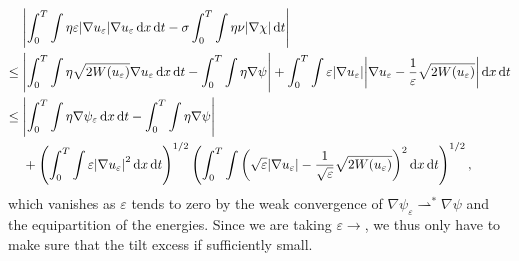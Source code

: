 \begin{align*}
	& 
	\abs{ 
	\int_{ 0 }^{ T }
		\int
			\eta
			\varepsilon
			\abs{ \nabla u_{ \varepsilon } }
			\nabla u_{ \varepsilon }
		\dd{ x }
	\dd{ t }
	-
	\sigma
	\int_{ 0 }^{ T }
		\int
			\eta
			\nu 
		\abs{ \nabla \chi }
	\dd{ t }
	}
	\\
	\leq {} &
	\abs{
		\int_{ 0 }^{ T }
			\int	
				\eta
				\sqrt{ 2 W ( u_{ \varepsilon } ) }
				\nabla u_{ \varepsilon }
			\dd{ x }
		\dd{ t }
		-
		\int_{ 0 }^{ T }
			\int
				\eta
				\nabla \psi
	}
	+
	\int_{ 0 }^{ T }
		\int
			\varepsilon
			\abs{ \nabla u_{ \varepsilon } }
			\abs{ \nabla u_{ \varepsilon } - \frac{ 1 }{ \varepsilon } \sqrt{ 2 W ( u_{ \varepsilon } ) } }
		\dd{ x }
	\dd{ t }
	\\
	\leq {} &
	\abs{
		\int_{ 0 }^{ T }
			\int
				\eta
				\nabla \psi_{ \varepsilon } 
			\dd{ x }
		\dd{ t }
		-
		\int_{ 0 }^{ T }
			\int
				\eta
				\nabla \psi 
	}
	\\
	& +
	\left(
		\int_{ 0 }^{ T }
			\int
				\varepsilon \abs{ \nabla u_{ \varepsilon } }^{ 2 }
			\dd{ x }
		\dd{ t }
	\right)^{ 1/2 }
	\left(
		\int_{ 0 }^{ T }
			\int
				\left(
					\sqrt{ \varepsilon }
					\abs{ \nabla u_{ \varepsilon } }
					-
					\frac{ 1 }{ \sqrt{ \varepsilon } }
					\sqrt{ 2 W ( u_{ \varepsilon } ) }
				\right)^{ 2 }
			\dd{ x }
		\dd{ t }
	\right)^{ 1/2 },
\end{align*}
which vanishes as $ \varepsilon $ tends to zero by the weak convergence of $ \nabla \psi_{ \varepsilon } \rightharpoonup^{ \ast } \nabla \psi $ and the equipartition of the energies.
Since we are taking $ \varepsilon \to $, we thus only have to make sure that the tilt excess if sufficiently small.

